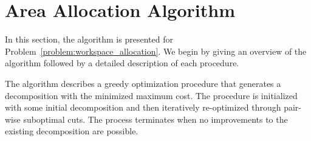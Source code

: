 \documentclass[../main.tex]{subfiles}
\begin{document}
%		








\section{Area Allocation Algorithm}
\label{section:multi_algorithm}

In this section, the algorithm is presented for Problem~\ref{problem:workspace_allocation}. We begin by giving an overview of the algorithm followed by a detailed description of each procedure.

The algorithm describes a greedy optimization procedure that generates a decomposition with the minimized maximum cost. The procedure is initialized with some initial decomposition and then iteratively re-optimized through pair-wise suboptimal cuts. The process terminates when no improvements to the existing decomposition are possible. %
\end{document}
